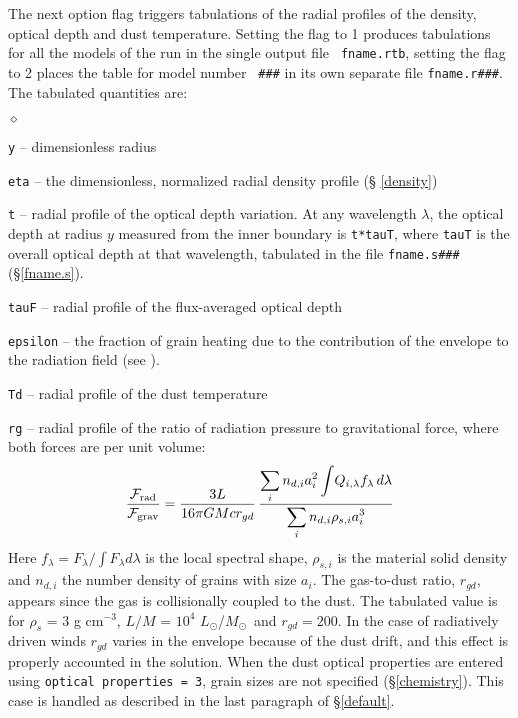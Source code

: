 \documentclass[12pt]{article} \usepackage{epsf}
\def\E#1{\hbox{$10^{#1}$}}
\def\eq#1{\begin{equation} #1 \end{equation}}
\def\Mo     {\hbox{$M_{\odot}$}}
\def\Lo     {\hbox{$L_{\odot}$}}
\def\DS     {\displaystyle}
\def\sub#1{_{\rm #1}}
\def\Frad {\hbox{${\cal F}\sub{rad}$}}
\def\Fgrav{\hbox{${\cal F}\sub{grav}$}}
\begin{document}
The next option flag triggers tabulations of the radial profiles of the
density, optical depth and dust temperature. Setting the flag to 1 produces
tabulations for all the models of the run in the single output file {\tt
fname.rtb}, setting the flag to 2 places the table for model number {\tt
\#\#\#} in its own separate file {\tt fname.r\#\#\#}. The tabulated quantities
are:

\begin{list}{$\diamond$}{}
\item{\tt y} -- dimensionless radius
\item{\tt eta} -- the dimensionless, normalized radial density profile (\S
\ref{density})
\item
{\tt t} -- radial profile of the optical depth variation.  At any wavelength
$\lambda$, the optical depth at radius $y$ measured from the inner boundary is
{\tt t*tauT}, where {\tt tauT} is the overall optical depth at that wavelength,
tabulated in the file {\tt fname.s\#\#\#} (\S \ref{fname.s}).

\item{\tt tauF} -- radial profile of the flux-averaged optical depth
\item
{\tt epsilon} -- the fraction of grain heating due to the contribution of the
envelope to the radiation field (see \cite{IE97}).
\item{\tt Td} -- radial profile of the dust temperature
\item{\tt rg} -- radial profile of the ratio of radiation pressure
to gravitational force, where both forces are per unit volume:
\eq{
    {\Frad\over\Fgrav} = {3L\over16\pi GMc r_{gd}}\,
    {\DS \sum_i n_{d,i} a_i^2\int\!Q_{i,\lambda} f_\lambda\,d\lambda \over
     \DS \sum_i n_{d,i}\rho_{s,i}a_i^3}
}
Here $f_\lambda = F_\lambda/\int F_\lambda d\lambda$ is the local spectral
shape, $\rho_{s,i}$ is the material solid density and $n_{d,i}$ the number
density of grains with size $a_i$.  The gas-to-dust ratio, $r_{gd}$, appears
since the gas is collisionally coupled to the dust. The tabulated value is for
$\rho_s$ = 3 g cm$^{-3}$, $L/M$ = \E4 \Lo/\Mo\ and $r_{gd} = 200$. In the case
of radiatively driven winds $r_{gd}$ varies in the envelope because of the dust
drift, and this effect is properly accounted in the solution. When the dust
optical properties are entered using {\tt optical properties = 3}, grain sizes
are not specified (\S \ref{chemistry}). This case is handled as described in
the last paragraph of \S\ref{default}.

\end{list}
\end{document}
